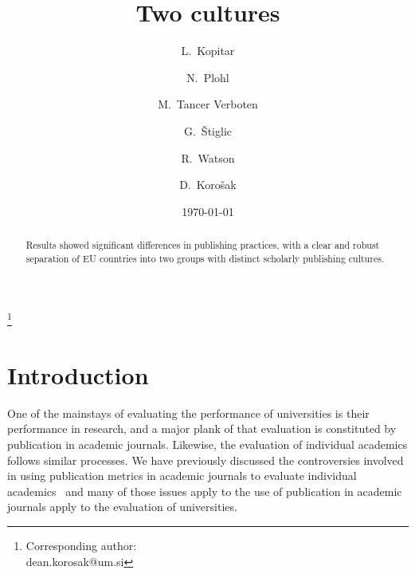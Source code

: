 \documentclass[amsfonts, amssymb, prl, superscriptaddress, notitlepage, twocolumn, nofootinbib]{revtex4-2}
\begin{document}
\title{Two cultures}
\author{L.~Kopitar }

\author{N.~Plohl}

\author{M.~Tancer Verboten}


\author{G.~Štiglic }

\author{R.~Watson }

\author{D.~Korošak  }
\thanks{Corresponding author:\\dean.korosak@um.si}




\date{\today}

\begin{abstract}
Results showed significant differences in publishing practices, with a clear and robust separation of EU countries into two groups with distinct scholarly publishing cultures.
\end{abstract}

\maketitle 

\section{Introduction}
One of the mainstays of evaluating the performance of universities is their performance in research, and a major plank of that evaluation is constituted by publication in academic journals. Likewise, the evaluation of individual academics follows similar processes. 
We have previously discussed the controversies involved in using publication metrics in academic journals to evaluate individual academics~\cite{watson2023assessing} and many of those issues apply to the use of publication in academic journals apply to the evaluation of universities. 
\end{document}

